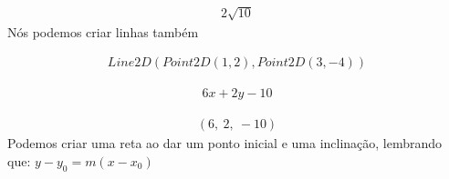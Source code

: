 \documentclass[letterpaper,10pt,english]{jupyterBook}
\begin{document}
\begin{sphinxVerbatim}[commandchars=\\\{\}]
 
\end{sphinxVerbatim}
\begin{equation*}
\begin{split}\displaystyle 2 \sqrt{10}\end{split}
\end{equation*}
\sphinxAtStartPar
Nós podemos criar linhas também

\begin{sphinxVerbatim}[commandchars=\\\{\}]
\end{sphinxVerbatim}
\begin{equation*}
\begin{split}\displaystyle Line2D\left(Point2D\left(1, 2\right), Point2D\left(3, -4\right)\right)\end{split}
\end{equation*}
\begin{sphinxVerbatim}[commandchars=\\\{\}]
  
 
\end{sphinxVerbatim}
\begin{equation*}
\begin{split}\displaystyle 6 x + 2 y - 10\end{split}
\end{equation*}
\begin{sphinxVerbatim}[commandchars=\\\{\}]
 
\end{sphinxVerbatim}
\begin{equation*}
\begin{split}\displaystyle \left( 6, \  2, \  -10\right)\end{split}
\end{equation*}
\sphinxAtStartPar
Podemos criar uma reta ao dar um ponto inicial e uma inclinação, lembrando que: \(y - y_0 = m(x-x_0)\)
\end{document}
